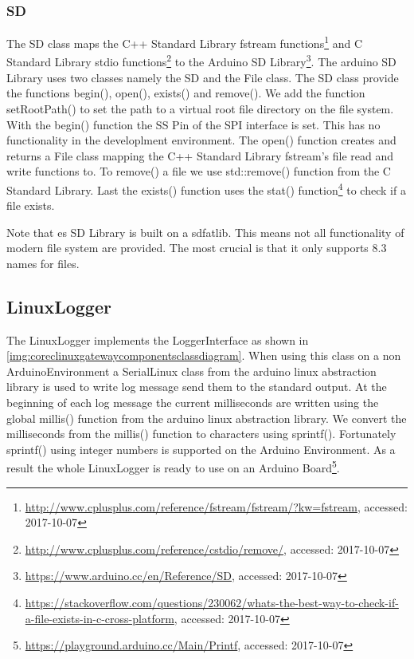 \subsubsection{SD}
The SD class maps the C++ Standard Library fstream functions\footnote{\url{http://www.cplusplus.com/reference/fstream/fstream/?kw=fstream}, accessed: 2017-10-07} and C Standard Library stdio functions\footnote{\url{http://www.cplusplus.com/reference/cstdio/remove/}, accessed: 2017-10-07} to the Arduino SD Library\footnote{\url{https://www.arduino.cc/en/Reference/SD}, accessed: 2017-10-07}.
The arduino SD Library uses two classes namely the SD and the File class.
The SD class provide the functions begin(), open(), exists() and remove().
We add the function setRootPath() to set the path to a virtual root file directory on the file system.
With the begin() function the SS Pin of the SPI interface is set.
This has no functionality in the developlment environment.
The open() function creates and returns a File class mapping the C++ Standard Library fstream's file read and write functions to.
To remove() a file we use std::remove() function from the C Standard Library.
Last the exists() function uses the stat() function\footnote{\url{https://stackoverflow.com/questions/230062/whats-the-best-way-to-check-if-a-file-exists-in-c-cross-platform}, accessed: 2017-10-07} to check if a file exists.

Note that es SD Library is built on a sdfatlib.
This means not all functionality of modern file system are provided.
The most crucial is that it only supports 8.3 names for files\cite{83filenames}\cite{arduinosdlibrary}.

\subsection{LinuxLogger}
The LinuxLogger implements the LoggerInterface as shown in \autoref{img:coreclinuxgatewaycomponentsclassdiagram}.
When using this class on a non ArduinoEnvironment a SerialLinux class from the arduino linux abstraction library is used to write log message send them to the standard output.
At the beginning of each log message the current milliseconds are written using the global millis() function from the arduino linux abstraction library.
We convert the milliseconds from the millis() function to characters using sprintf(). Fortunately sprintf() using integer numbers is supported on the Arduino Environment. 
As a result the whole LinuxLogger is ready to use on an Arduino Board\footnote{\url{https://playground.arduino.cc/Main/Printf}, accessed: 2017-10-07}.
